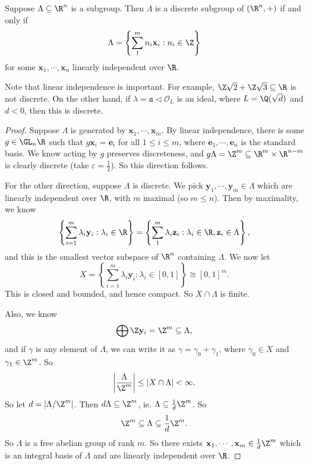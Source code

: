 \documentclass[a4paper]{article}
\begin{document}
\begin{prop}
  Suppose $\Lambda \subseteq \R^n$ is a subgroup. Then $\Lambda$ is a discrete subgroup of $(\R^n, +)$ if and only if
  \[
    \Lambda = \left\{\sum_1^m n_i \mathbf{x}_i : n_i \in \Z\right\}
  \]
  for some $\mathbf{x}_1, \cdots, \mathbf{x}_n$ linearly independent over $\R$.
\end{prop}

Note that linear independence is important. For example, $\Z \sqrt{2} + \Z \sqrt{3} \subseteq \R$ is not discrete. On the other hand, if $\lambda = \mathfrak{a} \lhd \mathcal{O}_L$ is an ideal, where $L = \Q(\sqrt{d})$ and $d < 0$, then this is discrete.

\begin{proof}
  Suppose $\Lambda$ is generated by $\mathbf{x}_1, \cdots, \mathbf{x}_m$. By linear independence, there is some $g \in \GL_n \R$ such that $g \mathbf{x}_i = \mathbf{e}_i$ for all $1 \leq i \leq m$, where $\mathbf{e}_1, \cdots, \mathbf{e}_n$ is the standard basis. We know acting by $g$ preserves discreteness, and $g\Lambda = \Z^m \subseteq \R^m \times \R^{n - m}$ is clearly discrete (take $\varepsilon = \frac{1}{2}$). So this direction follows.

  For the other direction, suppose $\Lambda$ is discrete. We pick $\mathbf{y}_1, \cdots, \mathbf{y}_m \in \Lambda$ which are linearly independent over $\R$, with $m$ maximal (so $m \leq n$). Then by maximality, we know
  \[
    \left\{\sum_{i = 1}^m \lambda_i \mathbf{y}_i: \lambda_i \in \R\right\} = \left\{ \sum_1^m \lambda_i \mathbf{z}_i: \lambda_i \in \R, \mathbf{z}_i \in \Lambda\right\},
  \]
  and this is the smallest vector subspace of $\R^n$ containing $\Lambda$. We now let
  \[
    X = \left\{\sum_{i = 1}^m \lambda_i \mathbf{y}_i: \lambda_i \in [0, 1]\right\} \cong [0, 1]^m.
  \]
  This is closed and bounded, and hence compact. So $X \cap \Lambda$ is finite.

  Also, we know
  \[
    \bigoplus \Z \mathbf{y}_i = \Z^m \subseteq \Lambda,
  \]
  and if $\gamma$ is any element of $\Lambda$, we can write it as $\gamma = \gamma_0 + \gamma_1$, where $\gamma_0 \in X$ and $\gamma_1 \in \Z^m$. So
  \[
    \left|\frac{\Lambda}{\Z^m}\right| \leq |X \cap \Lambda| < \infty.
  \]
  So let $d = |\Lambda/\Z^m|$. Then $d \Lambda \subseteq \Z^m$, ie. $\Lambda \subseteq \frac{1}{d} \Z^m$. So
  \[
    \Z^m \subseteq \Lambda \subseteq \frac{1}{d} \Z^m.
  \]
  So $\Lambda$ is a free abelian group of rank $m$. So there exists $\mathbf{x}_1, \cdots, \mathbf{x}_m \in \frac{1}{d}\Z^m$ which is an integral basis of $\Lambda$ and are linearly independent over $\R$.
\end{proof}
\end{document}
